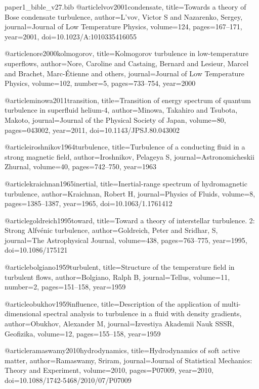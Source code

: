 \begin{filecontents}[overwrite]{paper1_bible_v27.bib}
@article{lvov2001condensate,
  title={Towards a theory of Bose condensate turbulence},
  author={L'vov, Victor S and Nazarenko, Sergey},
  journal={Journal of Low Temperature Physics},
  volume={124},
  pages={167--171},
  year={2001},
  doi={10.1023/A:1010335416055}
}

@article{nore2000kolmogorov,
  title={Kolmogorov turbulence in low-temperature superflows},
  author={Nore, Caroline and Castaing, Bernard and Lesieur, Marcel and Brachet, Marc-\'Etienne and others},
  journal={Journal of Low Temperature Physics},
  volume={102},
  number={5},
  pages={733--754},
  year={2000}
}


@article{minowa2011transition,
  title={Transition of energy spectrum of quantum turbulence in superfluid helium-4},
  author={Minowa, Takahiro and Tsubota, Makoto},
  journal={Journal of the Physical Society of Japan},
  volume={80},
  pages={043002},
  year={2011},
  doi={10.1143/JPSJ.80.043002}
}

@article{iroshnikov1964turbulence,
  title={Turbulence of a conducting fluid in a strong magnetic field},
  author={Iroshnikov, Pelageya S},
  journal={Astronomicheskii Zhurnal},
  volume={40},
  pages={742--750},
  year={1963}
}

@article{kraichnan1965inertial,
  title={Inertial-range spectrum of hydromagnetic turbulence},
  author={Kraichnan, Robert H},
  journal={Physics of Fluids},
  volume={8},
  pages={1385--1387},
  year={1965},
  doi={10.1063/1.1761412}
}

@article{goldreich1995toward,
  title={Toward a theory of interstellar turbulence. 2: Strong Alfv\'enic turbulence},
  author={Goldreich, Peter and Sridhar, S},
  journal={The Astrophysical Journal},
  volume={438},
  pages={763--775},
  year={1995},
  doi={10.1086/175121}
}

@article{bolgiano1959turbulent,
  title={Structure of the temperature field in turbulent flows},
  author={Bolgiano, Ralph B},
  journal={Tellus},
  volume={11},
  number={2},
  pages={151--158},
  year={1959}
}

@article{obukhov1959influence,
  title={Description of the application of multi-dimensional spectral analysis to turbulence in a fluid with density gradients},
  author={Obukhov, Alexander M},
  journal={Izvestiya Akademii Nauk SSSR, Geofizika},
  volume={12},
  pages={155--158},
  year={1959}
}

@article{ramaswamy2010hydrodynamics,
  title={Hydrodynamics of soft active matter},
  author={Ramaswamy, Sriram},
  journal={Journal of Statistical Mechanics: Theory and Experiment},
  volume={2010},
  pages={P07009},
  year={2010},
  doi={10.1088/1742-5468/2010/07/P07009}
}


\end{filecontents}
